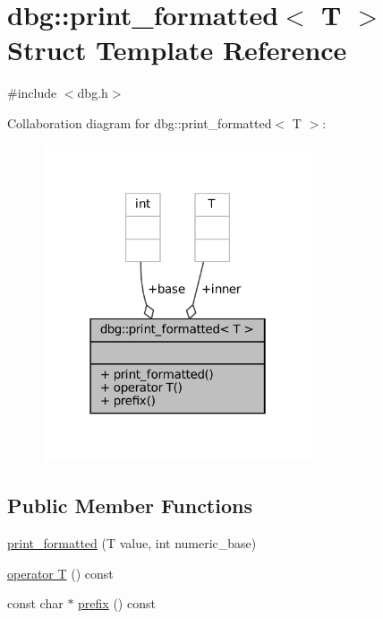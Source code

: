 \hypertarget{structdbg_1_1print__formatted}{}\section{dbg\+:\+:print\+\_\+formatted$<$ T $>$ Struct Template Reference}
\label{structdbg_1_1print__formatted}


{\ttfamily \#include $<$dbg.\+h$>$}



Collaboration diagram for dbg\+:\+:print\+\_\+formatted$<$ T $>$\+:
\nopagebreak
\begin{figure}[H]
\begin{center}
\leavevmode
\includegraphics[width=226pt]{structdbg_1_1print__formatted__coll__graph}
\end{center}
\end{figure}
\subsection*{Public Member Functions}
\begin{DoxyCompactItemize}
\item 
\hyperlink{structdbg_1_1print__formatted_a77fef2b6aa871171bfefe58bab8a03fe}{print\+\_\+formatted} (T value, int numeric\+\_\+base)
\item 
\hyperlink{structdbg_1_1print__formatted_ab6a7c4280acb807f5c5ab812f80a8aca}{operator T} () const
\item 
const char $\ast$ \hyperlink{structdbg_1_1print__formatted_ab490d37d984d053177b6af3f94d0136e}{prefix} () const
\end{DoxyCompactItemize}
